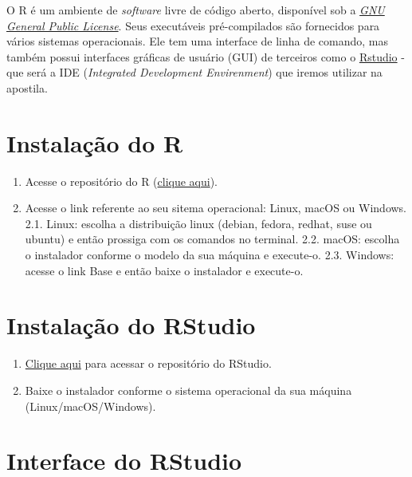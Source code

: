 \documentclass[
]{book}
\providecommand{\tightlist}{%
  \setlength{\itemsep}{0pt}\setlength{\parskip}{0pt}}
\theoremstyle{definition}
\theoremstyle{definition}
\theoremstyle{definition}
\theoremstyle{definition}
\theoremstyle{remark}
\begin{document}
O R é um ambiente de \emph{software} livre de código aberto, disponível sob a \href{https://en.wikipedia.org/wiki/GNU_General_Public_License}{\emph{GNU General Public License}}. Seus executáveis pré-compilados são fornecidos para vários sistemas operacionais. Ele tem uma interface de linha de comando, mas também possui interfaces gráficas de usuário (GUI) de terceiros como o \href{https://posit.co/download/rstudio-desktop/}{Rstudio} - que será a IDE (\emph{Integrated Development Envirenment}) que iremos utilizar na apostila.

\hypertarget{instalauxe7uxe3o-do-r}{%
\section{Instalação do R}\label{instalauxe7uxe3o-do-r}}

\begin{enumerate}
\def\labelenumi{\arabic{enumi}.}
\tightlist
\item
  Acesse o repositório do R (\href{https://cran-r.c3sl.ufpr.br/}{clique aqui}).
\item
  Acesse o link referente ao seu sitema operacional: Linux, macOS ou Windows.
  2.1. Linux: escolha a distribuição linux (debian, fedora, redhat, suse ou ubuntu) e então prossiga com os comandos no terminal.
  2.2. macOS: escolha o instalador conforme o modelo da sua máquina e execute-o.
  2.3. Windows: acesse o link Base e então baixe o instalador e execute-o.
\end{enumerate}

\hypertarget{instalauxe7uxe3o-do-rstudio}{%
\section{Instalação do RStudio}\label{instalauxe7uxe3o-do-rstudio}}

\begin{enumerate}
\def\labelenumi{\arabic{enumi}.}
\tightlist
\item
  \href{https://posit.co/download/rstudio-desktop/}{Clique aqui} para acessar o repositório do RStudio.
\item
  Baixe o instalador conforme o sistema operacional da sua máquina (Linux/macOS/Windows).
\end{enumerate}

\hypertarget{interface-do-rstudio}{%
\section{Interface do RStudio}\label{interface-do-rstudio}}
\end{document}
